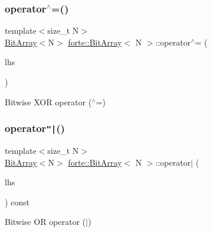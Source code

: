 \subsubsection{\texorpdfstring{operator$^\wedge$=()}{operator^=()}}
{\footnotesize\ttfamily template$<$size\+\_\+t N$>$ \\
\mbox{\hyperlink{classforte_1_1_bit_array}{Bit\+Array}}$<$N$>$ \mbox{\hyperlink{classforte_1_1_bit_array}{forte\+::\+Bit\+Array}}$<$ N $>$\+::operator$^\wedge$= (\begin{DoxyParamCaption}\item[{const \mbox{\hyperlink{classforte_1_1_bit_array}{Bit\+Array}}$<$ N $>$ \&}]{lhs }\end{DoxyParamCaption})\hspace{0.3cm}{\ttfamily [inline]}}



Bitwise X\+OR operator ($^\wedge$=) 

\mbox{\label{classforte_1_1_bit_array_a6a76d16ef5acbf96710ca3420dbd4be5}} 
\subsubsection{\texorpdfstring{operator\texttt{"|}()}{operator|()}}
{\footnotesize\ttfamily template$<$size\+\_\+t N$>$ \\
\mbox{\hyperlink{classforte_1_1_bit_array}{Bit\+Array}}$<$N$>$ \mbox{\hyperlink{classforte_1_1_bit_array}{forte\+::\+Bit\+Array}}$<$ N $>$\+::operator$\vert$ (\begin{DoxyParamCaption}\item[{const \mbox{\hyperlink{classforte_1_1_bit_array}{Bit\+Array}}$<$ N $>$ \&}]{lhs }\end{DoxyParamCaption}) const\hspace{0.3cm}{\ttfamily [inline]}}



Bitwise OR operator ($\vert$) 

\mbox{\label{classforte_1_1_bit_array_a64a5143b2b9e32399197546d239b6ac0}} 
